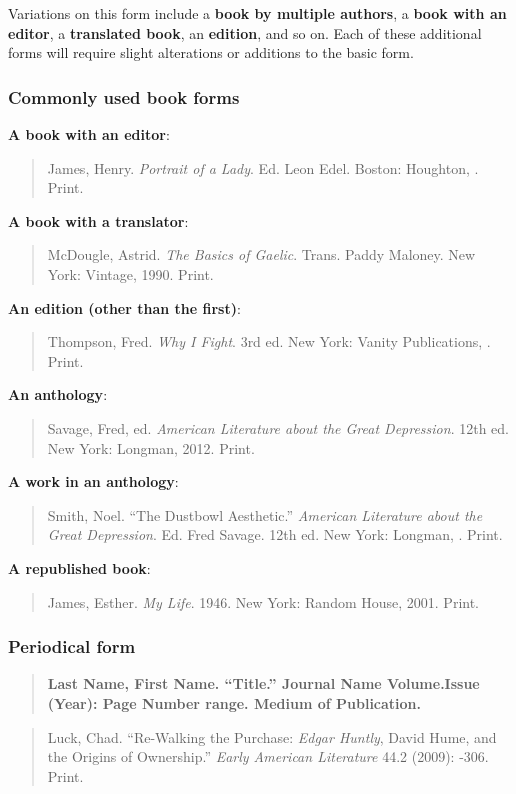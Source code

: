 Variations on this form include a {\bf book by multiple authors}, a {\bf book with an editor}, a {\bf translated book}, an {\bf edition}, and so on. Each of these additional forms will require slight alterations or additions to the basic form. 

\subsubsection{Commonly used book forms}

\textbf{A book with an editor}: 
\begin{quote}
James, Henry. \emph{Portrait of a Lady}. Ed. Leon Edel. Boston: Houghton, . Print.
\end{quote}

\textbf{A book with a translator}: 
\begin{quote}
McDougle, Astrid. \emph{The Basics of Gaelic}. Trans. Paddy Maloney. New \tab York: Vintage, 1990. Print.
\end{quote}


\textbf{An edition (other than the first)}:
\begin{quote}
Thompson, Fred. \emph{Why I Fight}. 3rd ed. New York: Vanity Publications, . Print.
\end{quote}

\textbf{An anthology}: 
\begin{quote}
Savage, Fred, ed. \emph{American Literature about the Great Depression}. 12th \tab ed. New York: Longman, 2012. Print.
\end{quote}

\textbf{A work in an anthology}: 
\begin{quote}
Smith, Noel. ``The Dustbowl Aesthetic.'' \emph{American Literature about the \tab Great Depression}. Ed. Fred Savage. 12th ed. New York: Longman, . Print.
\end{quote}

\textbf{A republished book}: 
\begin{quote}
James, Esther. \emph{My Life}. 1946. New York: Random House, 2001. Print.
\end{quote}


\subsubsection{Periodical form}
\begin{quote}
\textbf{Last Name, First Name. ``Title.'' Journal Name Volume.Issue \tab (Year): Page Number range. Medium of Publication.}
\end{quote}
\medskip
\medskip
\begin{quote}
Luck, Chad. ``Re-Walking the Purchase: \emph{Edgar Huntly}, David Hume, and \tab the Origins of Ownership.'' \emph{Early American Literature} 44.2 (2009): -306. Print.
\end{quote}

